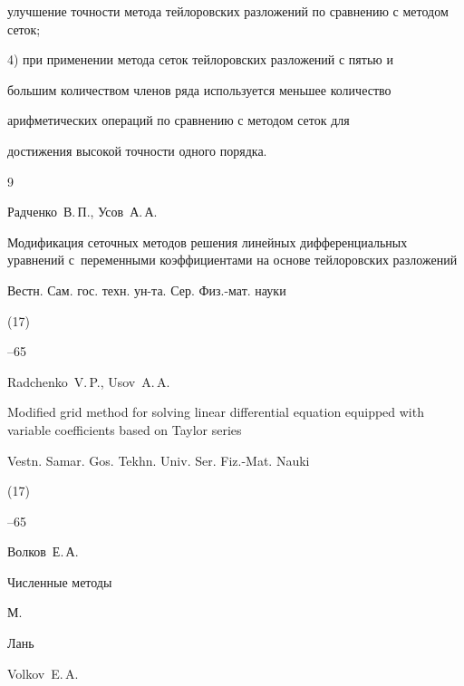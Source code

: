 улучшение точности метода тейлоровских разложений по сравнению с методом сеток;



4) при применении метода сеток тейлоровских разложений с пятью и

большим количеством членов ряда используется меньшее количество

арифметических операций по сравнению с методом сеток для

достижения высокой точности одного порядка.



\begin{thebibliography}{9}




\by Радченко~В.\,П., Усов~А.\,А.

\paper Модификация сеточных методов решения линейных дифференциальных уравнений с~переменными коэффициентами на основе тейлоровских разложений

\jour Вестн. Сам. гос. техн. ун-та. Сер. Физ.-мат. науки


(17)

--65



\misctransl

\by Radchenko~V.\,P., Usov~A.\,A.

\paper Modified grid method for solving linear differential equation equipped with variable coefficients based on Taylor series

\jour Vestn. Samar. Gos. Tekhn. Univ. Ser. Fiz.-Mat. Nauki


(17)

--65




\by Волков~Е.\,А.

\book Численные методы

\publaddr М.

\publ Лань



\misctransl

\by Volkov~E.\,A.


\end{thebibliography}
